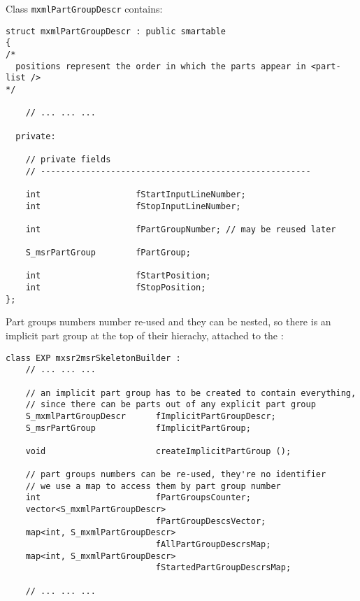 Class {\tt mxmlPartGroupDescr} contains:
\begin{lstlisting}[language=CPlusPlus]
struct mxmlPartGroupDescr : public smartable
{
/*
  positions represent the order in which the parts appear in <part-list />
*/

	// ... ... ...

  private:

    // private fields
    // ------------------------------------------------------

    int                   fStartInputLineNumber;
    int                   fStopInputLineNumber;

    int                   fPartGroupNumber; // may be reused later

    S_msrPartGroup        fPartGroup;

    int                   fStartPosition;
    int                   fStopPosition;
};
\end{lstlisting}

Part groups numbers number re-used and they can be nested, so there is an implicit part group at the top of their hierachy, attached to the :
\begin{lstlisting}[language=CPlusPlus]
class EXP mxsr2msrSkeletonBuilder :
	// ... ... ...

    // an implicit part group has to be created to contain everything,
    // since there can be parts out of any explicit part group
    S_mxmlPartGroupDescr      fImplicitPartGroupDescr;
    S_msrPartGroup            fImplicitPartGroup;

    void                      createImplicitPartGroup ();

    // part groups numbers can be re-used, they're no identifier
    // we use a map to access them by part group number
    int                       fPartGroupsCounter;
    vector<S_mxmlPartGroupDescr>
                              fPartGroupDescsVector;
    map<int, S_mxmlPartGroupDescr>
                              fAllPartGroupDescrsMap;
    map<int, S_mxmlPartGroupDescr>
                              fStartedPartGroupDescrsMap;

	// ... ... ...
\end{lstlisting}

